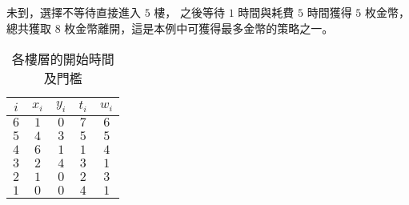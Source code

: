 未到，選擇不等待直接進入 \begin{math}5\end{math} 樓， 之後等待
\begin{math}1\end{math} 時間與耗費 \begin{math}5\end{math} 時間獲得
\begin{math}5\end{math} 枚金幣，總共獲取 \begin{math}8\end{math}
枚金幣離開，這是本例中可獲得最多金幣的策略之一。

\begin{minipage}{0.35\textwidth}
\begin{table}[H]
  \centering
  \begin{tabular}{|c|c|c|c|c|}
  \hline
  $i$ & $x_i$ & $y_i$ & $t_i$ & $w_i$ \\
  \hline
  $6$ & $1$ & $0$ & $7$ & $6$ \\
  \hline
  $5$ & $4$ & $3$ & $5$ & $5$ \\
  \hline
  $4$ & $6$ & $1$ & $1$ & $4$ \\
  \hline
  $3$ & $2$ & $4$ & $3$ & $1$ \\
  \hline
  $2$ & $1$ & $0$ & $2$ & $3$ \\
  \hline
  $1$ & $0$ & $0$ & $4$ & $1$ \\
  \hline
  \end{tabular}
  \caption{各樓層的開始時間及門檻}
\end{table}
\end{minipage}
\hfill
